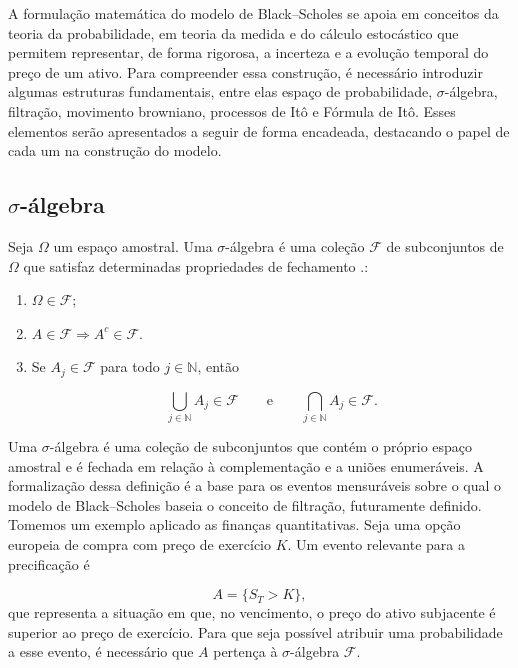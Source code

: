 A formulação matemática do modelo de Black--Scholes se apoia em conceitos da teoria da probabilidade, em teoria da medida e do cálculo estocástico que permitem representar, de forma rigorosa, a incerteza e a evolução temporal do preço de um ativo. Para compreender essa construção, é necessário introduzir algumas estruturas fundamentais, entre elas espaço de probabilidade, $\sigma$-álgebra, filtração, movimento browniano, processos de Itô e Fórmula de Itô. Esses elementos serão apresentados a seguir de forma encadeada, destacando o papel de cada um na construção do modelo.

\subsection{$\sigma$-álgebra}

Seja $\Omega$ um espaço amostral. Uma $\sigma$-álgebra é uma coleção
$\mathcal{F}$ de subconjuntos de $\Omega$ que satisfaz determinadas
propriedades de fechamento \cite{james2023}.:

\begin{enumerate}
    \item $\Omega \in \mathcal{F}$;
    
    \item $A \in \mathcal{F} \Rightarrow A^{c} \in \mathcal{F}$.

    \item Se $A_j \in \mathcal{F}$ para todo $j \in \mathbb{N}$, então

\begin{equation}
\bigcup_{j \in \mathbb{N}} A_j \in \mathcal{F}
\qquad \text{e} \qquad
\bigcap_{j \in \mathbb{N}} A_j \in \mathcal{F}.
\end{equation}
\end{enumerate}

Uma $\sigma$-álgebra é uma coleção de subconjuntos que contém o próprio espaço amostral e é fechada em relação à complementação e a uniões enumeráveis. A formalização dessa definição é a base para os eventos mensuráveis sobre o qual o modelo de Black--Scholes baseia o conceito de filtração, futuramente definido.
Tomemos um exemplo aplicado as finanças quantitativas. Seja uma opção europeia de compra com preço de exercício $K$. Um evento relevante para a precificação é

\begin{equation}
A = \{S_T > K\},
\end{equation}
que representa a situação em que, no vencimento, o preço do ativo subjacente
é superior ao preço de exercício. Para que seja possível atribuir uma
probabilidade a esse evento, é necessário que $A$ pertença à
$\sigma$-álgebra $\mathcal{F}$.

